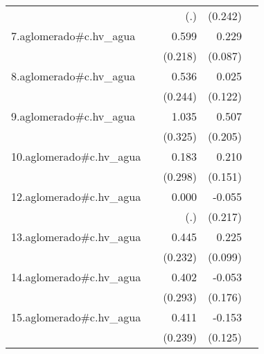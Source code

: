 {\begin{longtable}{l*{4}{D{.}{.}{-1}}}
            &                     &         (.)         &     (0.242)         &                     \\
\addlinespace
7.aglomerado#c.hv\_agua&                     &       0.599\sym{**} &       0.229\sym{**} &                     \\
            &                     &     (0.218)         &     (0.087)         &                     \\
\addlinespace
8.aglomerado#c.hv\_agua&                     &       0.536\sym{*}  &       0.025         &                     \\
            &                     &     (0.244)         &     (0.122)         &                     \\
\addlinespace
9.aglomerado#c.hv\_agua&                     &       1.035\sym{**} &       0.507\sym{*}  &                     \\
            &                     &     (0.325)         &     (0.205)         &                     \\
\addlinespace
10.aglomerado#c.hv\_agua&                     &       0.183         &       0.210         &                     \\
            &                     &     (0.298)         &     (0.151)         &                     \\
\addlinespace
12.aglomerado#c.hv\_agua&                     &       0.000         &      -0.055         &                     \\
            &                     &         (.)         &     (0.217)         &                     \\
\addlinespace
13.aglomerado#c.hv\_agua&                     &       0.445         &       0.225\sym{*}  &                     \\
            &                     &     (0.232)         &     (0.099)         &                     \\
\addlinespace
14.aglomerado#c.hv\_agua&                     &       0.402         &      -0.053         &                     \\
            &                     &     (0.293)         &     (0.176)         &                     \\
\addlinespace
15.aglomerado#c.hv\_agua&                     &       0.411         &      -0.153         &                     \\
            &                     &     (0.239)         &     (0.125)         &                     \\

\end{longtable}}
